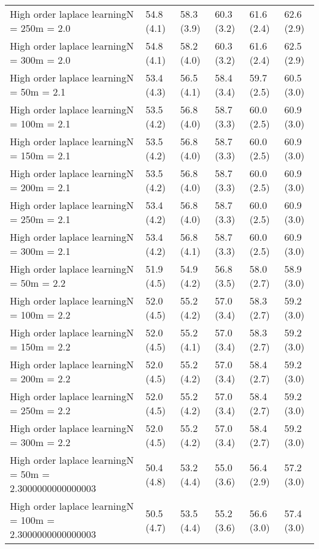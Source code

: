 \documentclass{article}
\begin{document}
\begin{table*}[t!]
\begin{center}
\begin{small}
\begin{sc}
\begin{tabular}{llllll}
High order laplace learningN = 250m = 2.0&54.8 (4.1)      &58.3 (3.9)      &60.3 (3.2)      &61.6 (2.4)      &62.6 (2.9)      \\
High order laplace learningN = 300m = 2.0&54.8 (4.1)      &58.2 (4.0)      &60.3 (3.2)      &61.6 (2.4)      &62.5 (2.9)      \\
High order laplace learningN = 50m = 2.1&53.4 (4.3)      &56.5 (4.1)      &58.4 (3.4)      &59.7 (2.5)      &60.5 (3.0)      \\
High order laplace learningN = 100m = 2.1&53.5 (4.2)      &56.8 (4.0)      &58.7 (3.3)      &60.0 (2.5)      &60.9 (3.0)      \\
High order laplace learningN = 150m = 2.1&53.5 (4.2)      &56.8 (4.0)      &58.7 (3.3)      &60.0 (2.5)      &60.9 (3.0)      \\
High order laplace learningN = 200m = 2.1&53.5 (4.2)      &56.8 (4.0)      &58.7 (3.3)      &60.0 (2.5)      &60.9 (3.0)      \\
High order laplace learningN = 250m = 2.1&53.4 (4.2)      &56.8 (4.0)      &58.7 (3.3)      &60.0 (2.5)      &60.9 (3.0)      \\
High order laplace learningN = 300m = 2.1&53.4 (4.2)      &56.8 (4.1)      &58.7 (3.3)      &60.0 (2.5)      &60.9 (3.0)      \\
High order laplace learningN = 50m = 2.2&51.9 (4.5)      &54.9 (4.2)      &56.8 (3.5)      &58.0 (2.7)      &58.9 (3.0)      \\
High order laplace learningN = 100m = 2.2&52.0 (4.5)      &55.2 (4.2)      &57.0 (3.4)      &58.3 (2.7)      &59.2 (3.0)      \\
High order laplace learningN = 150m = 2.2&52.0 (4.5)      &55.2 (4.1)      &57.0 (3.4)      &58.3 (2.7)      &59.2 (3.0)      \\
High order laplace learningN = 200m = 2.2&52.0 (4.5)      &55.2 (4.2)      &57.0 (3.4)      &58.4 (2.7)      &59.2 (3.0)      \\
High order laplace learningN = 250m = 2.2&52.0 (4.5)      &55.2 (4.2)      &57.0 (3.4)      &58.4 (2.7)      &59.2 (3.0)      \\
High order laplace learningN = 300m = 2.2&52.0 (4.5)      &55.2 (4.2)      &57.0 (3.4)      &58.4 (2.7)      &59.2 (3.0)      \\
High order laplace learningN = 50m = 2.3000000000000003&50.4 (4.8)      &53.2 (4.4)      &55.0 (3.6)      &56.4 (2.9)      &57.2 (3.0)      \\
High order laplace learningN = 100m = 2.3000000000000003&50.5 (4.7)      &53.5 (4.4)      &55.2 (3.6)      &56.6 (3.0)      &57.4 (3.0)      \\

\end{tabular}
\end{sc}
\end{small}
\end{center}
\end{table*}
\end{document}
